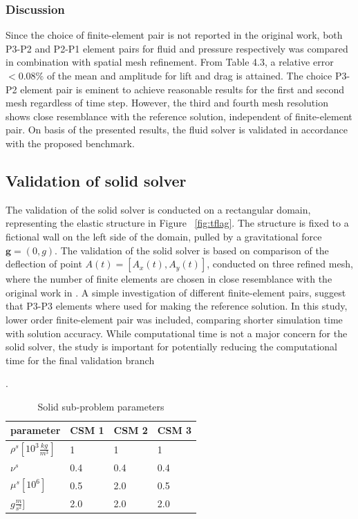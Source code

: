 \subsubsection*{Discussion}
Since the choice of finite-element pair is not reported in the original work, both P3-P2 and P2-P1 element pairs for fluid and pressure respectively was compared in combination with spatial mesh refinement. From Table 4.3, a relative error $ < 0.08\%$ of the mean and amplitude for lift and drag is attained. The choice P3-P2 element pair is eminent to achieve reasonable results for the first and second mesh regardless of time step.  However, the third and fourth mesh resolution shows close resemblance with the reference solution, independent of finite-element pair. On basis of the presented results, the fluid solver is validated in accordance with the proposed benchmark. 
\subsection{Validation of solid solver}
The validation of the solid solver is conducted on a rectangular domain, representing the elastic structure in Figure ~\ref{fig:tflag}.  The structure is fixed to a fictional wall on the left side of the domain, pulled by a gravitational force $\mathbf{g} = (0, g)$. The validation of the solid solver is based on comparison of the deflection of point $A(t) = [A_x(t), A_y(t)]$,  conducted on three refined mesh, where the number of finite elements are chosen in close resemblance with the original work in \cite{Hron2006}. A simple investigation of different finite-element pairs, suggest that P3-P3 elements where used for making the reference solution. In this study, lower order finite-element pair was included, comparing shorter simulation time with solution accuracy. While computational time is not a major concern for the solid solver, the study is important for potentially reducing the computational time for the final validation branch
\begin{table}[h!]
\centering.
\label{my-label}
\begin{tabular}{ |p{3cm}||p{2cm}|p{2cm}|p{2cm}|  }
 \hline
 parameter              & CSM 1 & CSM 2 & CSM 3 \\
 \hline
$\rho^s [10^{3}\frac{kg}{m^3}]$ & 1    & 1    & 1    \\
$\nu^s $  & 0.4    & 0.4    & 0.4    \\
$\mu^s  [10^{6}]$  & 0.5    & 2.0    & 0.5    \\
$g  \frac{m}{s^2}]$  & 2.0    & 2.0    & 2.0    \\
\hline
\end{tabular}
\caption{Solid sub-problem parameters}
\end{table}
\newpage
